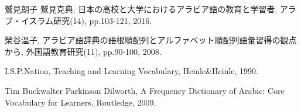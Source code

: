 \documentclass[technicalreport]{ieicej}
\begin{document}
\begin{thebibliography}{99}
鷲見朗子 鷲見克典, 日本の高校と大学におけるアラビア語の教育と学習者, アラブ・イスラム研究(14), pp.103-121, 2016.

榮谷温子, アラビア語辞典の語根順配列とアルファベット順配列語彙習得の観点から, 外国語教育研究(11), pp.90-100, 2008.

I.S.P.Nation, Teaching and Learning Vocabulary, Heinle\&Heinle, 1990. 

Tim Buckwalter  Parkinson Dilworth, A Frequency Dictionary of Arabic: Core Vocabulary for Learners, Routledge, 2009.

\end{thebibliography}
\end{document}
